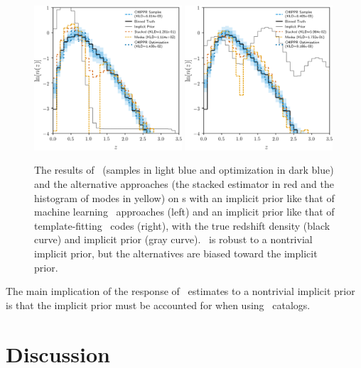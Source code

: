 \begin{figure}
	\includegraphics[width=0.49\textwidth]{figures/chippr/results_trpr.png}
	\includegraphics[width=0.49\textwidth]{figures/chippr/results_tmpr.png}
	\caption{
		The results of \Chippr\ (samples in light blue and optimization in dark blue) and the alternative approaches (the stacked estimator in red and the histogram of modes in yellow) on \pzpdf s with an implicit prior like that of machine learning \pzpdf\ approaches (left) and an implicit prior like that of template-fitting \pzpdf\ codes (right), with the true redshift density (black curve) and implicit prior (gray curve).
		\Chippr\ is robust to a nontrivial implicit prior, but the alternatives are biased toward the implicit prior.
	}
\end{figure}


The main implication of the response of \nz\ estimates to a nontrivial implicit prior is that the implicit prior must be accounted for when using \pzpdf\ catalogs.

\section{Discussion}


